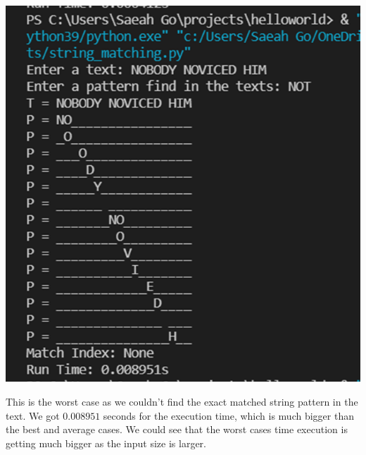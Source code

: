 \documentclass{article}
\begin{document}
\begin{center}
\includegraphics[scale = 0.7]{inputsize 18 worst.png} \\
\end{center}
This is the worst case as we couldn't find the exact matched string pattern in the text. We got $0.008951$ seconds for the execution time, which is much bigger than the best and average cases. We could see that the worst cases time execution is getting much bigger as the input size is larger.
\end{document}
